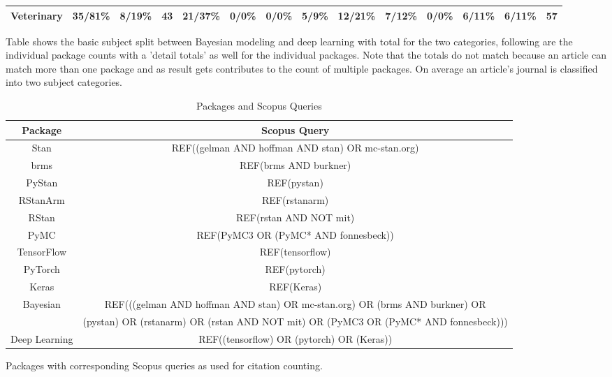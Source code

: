 \documentclass[AMA,STIX1COL]{WileyNJD-v2}
\begin{document}
\begin{table}
{\begin{tabular}{p{}|l|p{}|r||l|l|l|l|l|l|l|l|l|r}
\hline
Veterinary & 35/81\% & 8/19\% & 43 & 21/37\% & 0/0\% & 0/0\% & 5/9\% & 12/21\% & 7/12\% & 0/0\% & 6/11\% & 6/11\% & 57\\
\hline
\end{tabular}
}
\begin{tablenotes}
\begin{fill} 
\bigskip
Table shows the basic subject split between Bayesian modeling and deep learning with total for the two categories, following are the individual package counts with a 'detail totals' as well for the individual packages. Note that the totals do not match because an article can match more than one package and as result gets contributes to the count of multiple packages. On average an article's journal is classified into two subject categories. 
\end{fill}
\end{tablenotes}
\end{table}




\begin{center}
\begin{table}[t]%
\centering
\caption{Packages and Scopus Queries\label{tab2}}
\begin{tabular}{|c c|} 
 \hline
 Package & Scopus Query  \\ [0.5ex] 
 \hline
Stan &	REF((gelman AND hoffman AND stan) OR mc-stan.org) \\
 \hline
brms &	REF(brms AND burkner) \\
\hline
PyStan &	REF(pystan) \\
 \hline
 RStanArm &	REF(rstanarm) \\
  \hline
RStan	& REF(rstan AND NOT mit) \\
 \hline
PyMC &	REF(PyMC3 OR (PyMC* AND fonnesbeck)) \\
 \hline
TensorFlow &	REF(tensorflow) \\
 \hline
PyTorch &	REF(pytorch) \\
 \hline
Keras &	REF(Keras) \\
 \hline
Bayesian &	REF(((gelman AND hoffman AND stan) OR mc-stan.org) OR (brms AND burkner) OR \\
 & (pystan) OR (rstanarm) OR (rstan AND NOT mit) OR (PyMC3 OR (PyMC* AND fonnesbeck))) \\
 \hline
Deep Learning &	REF((tensorflow) OR (pytorch) OR (Keras)) \\
 \hline
\end{tabular}
\begin{tablenotes}
\begin{center}\bigskip Packages with corresponding Scopus queries as used for citation counting.
\end{center}
\end{tablenotes}
\end{table}
\end{center}
\end{document}
